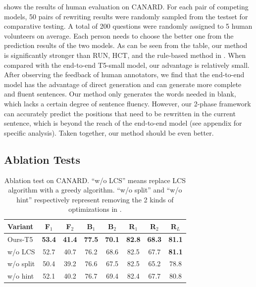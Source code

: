  shows the results of human evaluation on CANARD. For each pair of competing models, 50 pairs of rewriting results were randomly sampled from the testset for comparative testing. A total of 200 questions were randomly assigned to 5 human volunteers on average. Each person needs to choose the better one from the prediction results of the two models. As can be seen from the table, our method is significantly stronger than RUN, HCT, and the rule-based method in . When compared with the end-to-end T5-small model, our advantage is relatively small. After observing the feedback of human annotators, we find that the end-to-end model has the advantage of direct generation and can generate more complete and fluent sentences. Our method only generates the words needed in blank, which lacks a certain degree of sentence fluency. However, our 2-phase framework can accurately predict the positions that need to be rewritten in the current sentence, which is beyond the reach of the end-to-end model (see appendix for specific analysis).
 Taken together, our method should be even better.

\subsection{Ablation Tests}
\label{sec:ablation}

\begin{table}[h]
\setlength\tabcolsep{3pt}
\centering
\scriptsize
\begin{tabular}{lccccccc}
\toprule
\textbf{Variant}&    \textbf{F}$_1$ & \textbf{F}$_2$ & \textbf{B}$_1$ & \textbf{B}$_2$ & \textbf{R}$_1$ & \textbf{R}$_2$ & \textbf{R}$_L$\\ \midrule
Ours-T5   & \textbf{53.4} & \textbf{41.4} & \textbf{77.5} & \textbf{70.1}  & \textbf{82.8} & \textbf{68.3} & \textbf{81.1} \\ \midrule
w/o LCS    & 52.7 & 40.7 & 76.2 & 68.6 & 82.5 & 67.7 & \textbf{81.1} \\
w/o split  & 50.4 & 39.2 & 76.6 & 67.5 & 82.5 & 65.2 & 78.8 \\
w/o hint & 52.1 & 40.2 & 76.7 & 69.4 & 82.4 & 67.7 & 80.8 \\
\bottomrule
\end{tabular}
\caption{
Ablation test on CANARD. ``w/o LCS'' means replace LCS algorithm with a greedy algorithm. ``w/o split'' and ``w/o hint'' respectively represent removing the 2 kinds of optimizations in .}
\label{tab:ablation}
\end{table}

